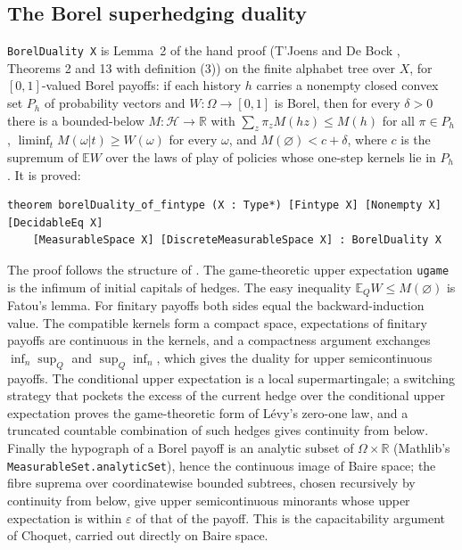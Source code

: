 \documentclass[11pt]{article}
\theoremstyle{definition}
\newcommand{\R}{\mathbb R}
\begin{document}
\subsection*{The Borel superhedging duality}
\texttt{BorelDuality X} is Lemma~2 of the hand proof (T'Joens and De Bock \cite{TDB}, Theorems 2 and 13 with definition (3)) on the finite alphabet tree over $X$, for $[0,1]$-valued Borel payoffs: if each history $h$ carries a nonempty closed convex set $P_h$ of probability vectors and $W:\Omega\to[0,1]$ is Borel, then for every $\delta>0$ there is a bounded-below $M:\mathcal H\to\R$ with $\sum_z\pi_zM(hz)\le M(h)$ for all $\pi\in P_h$, $\liminf_tM(\omega|t)\ge W(\omega)$ for every $\omega$, and $M(\varnothing)<c+\delta$, where $c$ is the supremum of $\mathbb E W$ over the laws of play of policies whose one-step kernels lie in $P_h$. It is proved:
\begin{verbatim}
theorem borelDuality_of_fintype (X : Type*) [Fintype X] [Nonempty X] [DecidableEq X]
    [MeasurableSpace X] [DiscreteMeasurableSpace X] : BorelDuality X
\end{verbatim}
The proof follows the structure of \cite{TDB}. The game-theoretic upper expectation \texttt{ugame} is the infimum of initial capitals of hedges. The easy inequality $\mathbb E_Q W\le M(\varnothing)$ is Fatou's lemma. For finitary payoffs both sides equal the backward-induction value. The compatible kernels form a compact space, expectations of finitary payoffs are continuous in the kernels, and a compactness argument exchanges $\inf_n\sup_Q$ and $\sup_Q\inf_n$, which gives the duality for upper semicontinuous payoffs. The conditional upper expectation is a local supermartingale; a switching strategy that pockets the excess of the current hedge over the conditional upper expectation proves the game-theoretic form of L\'evy's zero-one law, and a truncated countable combination of such hedges gives continuity from below. Finally the hypograph of a Borel payoff is an analytic subset of $\Omega\times\R$ (Mathlib's \texttt{MeasurableSet.analyticSet}), hence the continuous image of Baire space; the fibre suprema over coordinatewise bounded subtrees, chosen recursively by continuity from below, give upper semicontinuous minorants whose upper expectation is within $\varepsilon$ of that of the payoff. This is the capacitability argument of Choquet, carried out directly on Baire space.
\end{document}
